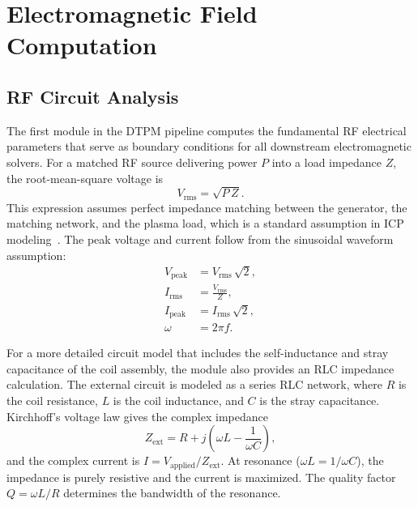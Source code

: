 \documentclass[11pt,a4paper]{report}
\begin{document}
\chapter{Electromagnetic Field Computation}
\label{ch:em}

\section{RF Circuit Analysis}
\label{sec:m01}

The first module in the DTPM pipeline computes the fundamental RF electrical parameters that serve as boundary conditions for all downstream electromagnetic solvers.  For a matched RF source delivering power $P$ into a load impedance $Z$, the root-mean-square voltage is
\begin{equation}
  V_\mathrm{rms} = \sqrt{P \, Z}.
  \label{eq:m01-vrms}
\end{equation}
This expression assumes perfect impedance matching between the generator, the matching network, and the plasma load, which is a standard assumption in ICP modeling~\cite{Lieberman2005}.  The peak voltage and current follow from the sinusoidal waveform assumption:
\begin{align}
  V_\mathrm{peak} &= V_\mathrm{rms}\,\sqrt{2}, \label{eq:m01-vpeak}\\
  I_\mathrm{rms}  &= \frac{V_\mathrm{rms}}{Z}, \label{eq:m01-irms}\\
  I_\mathrm{peak} &= I_\mathrm{rms}\,\sqrt{2}, \label{eq:m01-ipeak}\\
  \omega          &= 2\pi f. \label{eq:m01-omega}
\end{align}

For a more detailed circuit model that includes the self-inductance and stray capacitance of the coil assembly, the module also provides an RLC impedance calculation.  The external circuit is modeled as a series RLC network, where $R$ is the coil resistance, $L$ is the coil inductance, and $C$ is the stray capacitance.  Kirchhoff's voltage law gives the complex impedance
\begin{equation}
  Z_\mathrm{ext} = R + j\!\left(\omega L - \frac{1}{\omega C}\right),
  \label{eq:m01-rlc}
\end{equation}
and the complex current is $I = V_\mathrm{applied} / Z_\mathrm{ext}$.  At resonance ($\omega L = 1/\omega C$), the impedance is purely resistive and the current is maximized.  The quality factor $Q = \omega L / R$ determines the bandwidth of the resonance.
\end{document}
